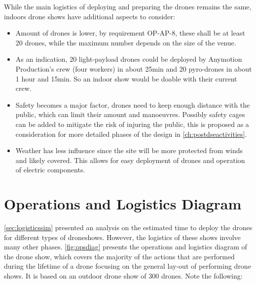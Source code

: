 While the main logistics of deploying and preparing the drones remains the same, indoors drone shows have additional aspects to consider:
\begin{itemize}[noitemsep,nolistsep]
    \item Amount of drones is lower, by requirement OP-AP-8, these shall be at least 20 drones, while the maximum number depends on the size of the venue.
    
    \item As an indication, 20 light-payload drones could be deployed by Anymotion Production's crew (four workers) in about 25min and 20 pyro-drones in about 1 hour and 15min. So an indoor show would be doable with their current crew.
    
    \item Safety becomes a major factor, drones need to keep enough distance with the public, which can limit their amount and manoeuvres. Possibly safety cages can be added to mitigate the risk of injuring the public, this is proposed as a consideration for more detailed phases of the design in \autoref{ch:postdseactivities}. 
    
    \item Weather has less influence since the site will be more protected from winds and likely covered. This allows for easy deployment of drones and operation of electric components.
\end{itemize}

\section{Operations and Logistics Diagram} \label{sec:logdiagram}

\autoref{sec:logisticssim} presented an analysis on the estimated time to deploy the drones for different types of droneshows. However, the logistics of these shows involve many other phases. \autoref{fig:opsdiag} presents the operations and logistics diagram of the drone show, which covers the majority of the actions that are performed during the lifetime of a drone focusing on the general lay-out of performing drone shows. It is based on an outdoor drone show of 300 drones. Note the following:

